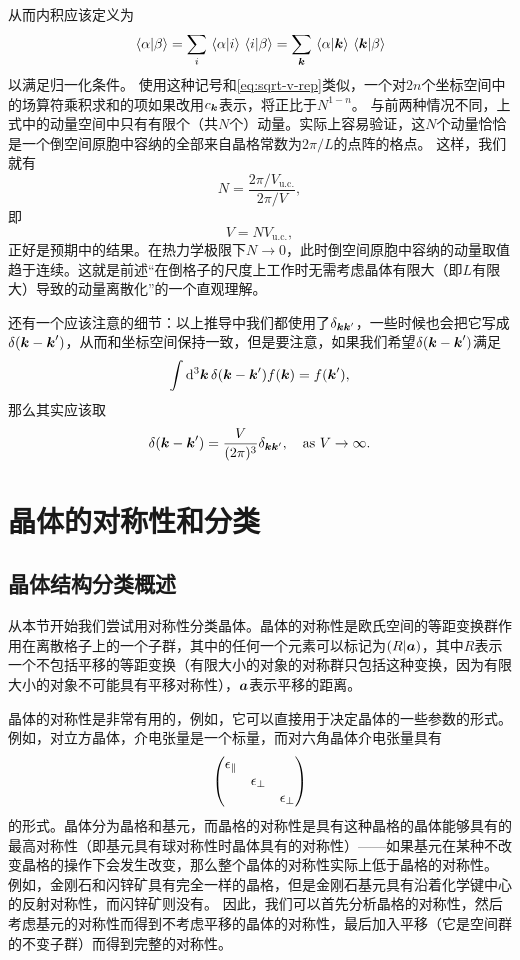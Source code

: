 \begin{enumerate}
    从而内积应该定义为
    \begin{equation}
        \braket*{\alpha}{\beta} = \sum_i \braket*{\alpha}{i} \braket*{i}{\beta} = \sum_{\vb*{k}} \braket*{\alpha}{\vb*{k}} \braket*{\vb*{k}}{\beta}
        \label{eq:sum-over-lattice}
    \end{equation}
    以满足归一化条件。
    使用这种记号和\eqref{eq:sqrt-v-rep}类似，一个对$2n$个坐标空间中的场算符乘积求和的项如果改用$c_{\vb*{k}}$表示，将正比于$N^{1-n}$。
    与前两种情况不同，上式中的动量空间中只有有限个（共$N$个）动量。实际上容易验证，这$N$个动量恰恰是一个倒空间原胞中容纳的全部来自晶格常数为$2\pi / L$的点阵的格点。
    这样，我们就有
    \[
        N = \frac{2\pi / V_\text{u.c.}}{2\pi / V},
    \]
    即
    \begin{equation}
        V = N V_\text{u.c.},
    \end{equation}
    正好是预期中的结果。在热力学极限下$N \to 0$，此时倒空间原胞中容纳的动量取值趋于连续。这就是前述“在倒格子的尺度上工作时无需考虑晶体有限大（即$L$有限大）导致的动量离散化”的一个直观理解。
\end{enumerate}

还有一个应该注意的细节：以上推导中我们都使用了$\delta_{\vb*{k} \vb*{k}'}$，一些时候也会把它写成$\delta(\vb*{k}- \vb*{k}')$，从而和坐标空间保持一致，但是要注意，如果我们希望$\delta(\vb*{k} - \vb*{k}')$满足
\[
    \int \dd[3]{\vb*{k}} \delta(\vb*{k} - \vb*{k}') f(\vb*{k}) = f(\vb*{k}'),
\]
那么其实应该取
\begin{equation}
    \delta(\vb*{k} - \vb*{k}') = \frac{V}{(2\pi)^3} \delta_{\vb*{k} \vb*{k}'} , \quad \text{as $V \to \infty$}.
\end{equation}

\section{晶体的对称性和分类}

\subsection{晶体结构分类概述}\label{sec:crystal-structure-intro}

从本节开始我们尝试用对称性分类晶体。晶体的对称性是欧氏空间的等距变换群作用在离散格子上的一个子群，其中的任何一个元素可以标记为$(R|\vb*{a})$，其中$R$表示一个不包括平移的等距变换（有限大小的对象的对称群只包括这种变换，因为有限大小的对象不可能具有平移对称性），$\vb*{a}$表示平移的距离。

晶体的对称性是非常有用的，例如，它可以直接用于决定晶体的一些参数的形式。例如，对立方晶体，介电张量是一个标量，而对六角晶体介电张量具有
\[
    \pmqty{\dmat{\epsilon_\parallel, \epsilon_\bot, \epsilon_\bot}}
\]
的形式。晶体分为晶格和基元，而晶格的对称性是具有这种晶格的晶体能够具有的最高对称性（即基元具有球对称性时晶体具有的对称性）——如果基元在某种不改变晶格的操作下会发生改变，那么整个晶体的对称性实际上低于晶格的对称性。
例如，金刚石和闪锌矿具有完全一样的晶格，但是金刚石基元具有沿着化学键中心的反射对称性，而闪锌矿则没有。 %
因此，我们可以首先分析晶格的对称性，然后考虑基元的对称性而得到不考虑平移的晶体的对称性，最后加入平移（它是空间群的不变子群）而得到完整的对称性。

